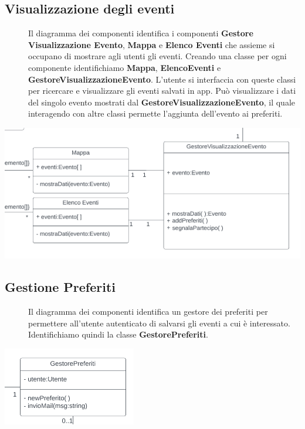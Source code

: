 \documentclass{article}
\begin{document}
\subsection{Visualizzazione degli eventi}
\begin{description}
    \item[] Il diagramma dei componenti identifica i componenti \textbf{Gestore Visualizzazione Evento}, \textbf{Mappa} e \textbf{Elenco Eventi} che assieme si occupano di mostrare agli utenti gli eventi. Creando una classe per ogni componente identifichiamo \textbf{Mappa}, \textbf{ElencoEventi} e \textbf{GestoreVisualizzazioneEvento}. L'utente si interfaccia con queste classi per ricercare e visualizzare gli eventi salvati in app. Può visualizzare i dati del singolo evento mostrati dal \textbf{GestoreVisualizzazioneEvento}, il quale interagendo con altre classi permette l'aggiunta dell'evento ai preferiti.
\end{description}
\begin{center}
    \item[] \includegraphics[scale=0.7]{visualizzaEventi.png}
\end{center}
\newpage
\subsection{Gestione Preferiti}
\begin{description}
    \item[] Il diagramma dei componenti identifica un gestore dei preferiti per permettere all'utente autenticato di salvarsi gli eventi a cui è interessato. Identifichiamo quindi la classe \textbf{GestorePreferiti}.
\end{description}
\begin{center}
    \item[] \includegraphics[scale=0.7]{preferiti.png}
\end{center}
\end{document}
